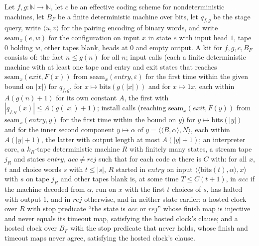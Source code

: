 \begin{definition}
\label{Turing.NTimeDiag.DzKit}
\leanok
{}
Let $f, g : \mathbb{N} \to \mathbb{N}$, let $c$ be an effective coding scheme for nondeterministic
machines, let $B_F$ be a finite deterministic machine over bits, let $q_{f,g}$ be the stage query,
write $\langle u, v\rangle$ for the pairing encoding of binary words, and write $\mathrm{seam}_x(e,
w)$ for the configuration on input $x$ in state $e$ with input head $1$, tape $0$ holding $w$,
other tapes blank, heads at $0$ and empty output. A kit for $f, g, c, B_F$ consists of: the fact $n
\le g(n)$ for all $n$; input calls (each a finite deterministic machine with at least one tape and
entry and exit states that reaches $\mathrm{seam}_x(\mathit{exit}, F(x))$ from
$\mathrm{seam}_x(\mathit{entry}, \varepsilon)$ for the first time within the given bound on $|x|$)
for $q_{f,g}$, for $x \mapsto \mathrm{bits}(g(|x|))$ and for $x \mapsto 1x$, each within $A(g(n) +
1)$ for its own constant $A$, the first with $|q_{f,g}(x)| \le A(g(|x|) + 1)$; install calls
(reaching $\mathrm{seam}_x(\mathit{exit}, F(y))$ from $\mathrm{seam}_x(\mathit{entry}, y)$ for the
first time within the bound on $y$) for $y \mapsto \mathrm{bits}(|y|)$ and for the inner second
component $y \mapsto \alpha$ of $y = \langle\langle B, \alpha\rangle, N\rangle$, each within $A(|y|
+ 1)$, the latter with output length at most $A(|y| + 1)$; an interpreter core, a $k_R$-tape
deterministic machine $R$ with finitely many states, a stream tape $j_R$ and states
$\mathit{entry}$, $\mathit{acc} \ne \mathit{rej}$ such that for each code $\alpha$ there is $C$
with: for all $x$, $t$ and choice words $s$ with $t \le |s|$, $R$ started in $\mathit{entry}$ on
input $\langle\langle \mathrm{bits}(t), \alpha\rangle, x\rangle$ with $s$ on tape $j_R$ and other
tapes blank is, at some time $T \le C(t + 1)$, in $\mathit{acc}$ if the machine decoded from
$\alpha$, run on $x$ with the first $t$ choices of $s$, has halted with output $1$, and in
$\mathit{rej}$ otherwise, and in neither state earlier; a hosted clock over $R$ with stop predicate
``the state is $\mathit{acc}$ or $\mathit{rej}$'' whose finish map is injective and never equals
its timeout map, satisfying the hosted clock's clause; and a hosted clock over $B_F$ with the stop
predicate that never holds, whose finish and timeout maps never agree, satisfying the hosted
clock's clause.
\end{definition}

